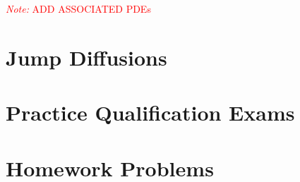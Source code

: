 \documentclass[12pt]{article}
\newcommand{\note}[1]{\textcolor{red}{\textit{Note:} #1}}
\begin{document}
\note{ADD ASSOCIATED PDEs}



\pagebreak
\section{Jump Diffusions}



\pagebreak
\section{Practice Qualification Exams}


\pagebreak
\section{Homework Problems}








\end{document}

